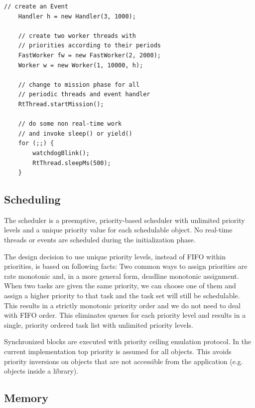 \begin{lstlisting}[float=t,caption={Start of the application},
label=lst:arch:rt:profile:usage]
    // create an Event
    Handler h = new Handler(3, 1000);

    // create two worker threads with
    // priorities according to their periods
    FastWorker fw = new FastWorker(2, 2000);
    Worker w = new Worker(1, 10000, h);

    // change to mission phase for all
    // periodic threads and event handler
    RtThread.startMission();

    // do some non real-time work
    // and invoke sleep() or yield()
    for (;;) {
        watchdogBlink();
        RtThread.sleepMs(500);
    }
\end{lstlisting}



\subsection{Scheduling}

The scheduler is a preemptive, priority-based scheduler with
unlimited priority levels and a unique priority value for each
schedulable object. No real-time threads or events are scheduled
during the initialization phase.

The design decision to use unique priority levels, instead of FIFO
within priorities, is based on following facts: Two common ways to
assign priorities are rate monotonic and, in a more general form,
deadline monotonic assignment. When two tasks are given the same
priority, we can choose one of them and assign a higher priority to
that task and the task set will still be schedulable. This results
in a strictly monotonic priority order and we do not need to deal
with FIFO order. This eliminates queues for each priority level and
results in a single, priority ordered task list with unlimited
priority levels.

Synchronized blocks are executed with priority ceiling emulation
protocol. In the current implementation top priority is assumed for
all objects. This avoids priority inversions on objects that are not
accessible from the application (e.g. objects inside a library).


\subsection{Memory}

